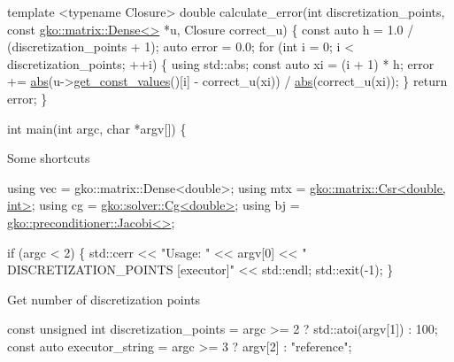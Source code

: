 \begin{DoxyCode}
\textcolor{keyword}{template} <\textcolor{keyword}{typename} Closure>
\textcolor{keywordtype}{double} calculate\_error(\textcolor{keywordtype}{int} discretization\_points, \textcolor{keyword}{const} \hyperlink{classgko_1_1matrix_1_1Dense}{gko::matrix::Dense<>} *u,
                       Closure correct\_u)
\{
    \textcolor{keyword}{const} \textcolor{keyword}{auto} h = 1.0 / (discretization\_points + 1);
    \textcolor{keyword}{auto} error = 0.0;
    \textcolor{keywordflow}{for} (\textcolor{keywordtype}{int} i = 0; i < discretization\_points; ++i) \{
        \textcolor{keyword}{using} std::abs;
        \textcolor{keyword}{const} \textcolor{keyword}{auto} xi = (i + 1) * h;
        error +=
            \hyperlink{namespacegko_a57797fc0a00fd4b7ff34ca4bfc84bc51}{abs}(u->\hyperlink{classgko_1_1matrix_1_1Dense_ab83c739c1b11abaecc3bfd89506f6c9c}{get\_const\_values}()[i] - correct\_u(xi)) / 
      \hyperlink{namespacegko_a57797fc0a00fd4b7ff34ca4bfc84bc51}{abs}(correct\_u(xi));
    \}
    \textcolor{keywordflow}{return} error;
\}


\textcolor{keywordtype}{int} main(\textcolor{keywordtype}{int} argc, \textcolor{keywordtype}{char} *argv[])
\{
\end{DoxyCode}


Some shortcuts


\begin{DoxyCode}
\textcolor{keyword}{using} vec = gko::matrix::Dense<double>;
\textcolor{keyword}{using} mtx = \hyperlink{classgko_1_1matrix_1_1Csr}{gko::matrix::Csr<double, int>};
\textcolor{keyword}{using} cg = \hyperlink{classgko_1_1solver_1_1Cg}{gko::solver::Cg<double>};
\textcolor{keyword}{using} bj = \hyperlink{classgko_1_1preconditioner_1_1Jacobi}{gko::preconditioner::Jacobi<>};

\textcolor{keywordflow}{if} (argc < 2) \{
    std::cerr << \textcolor{stringliteral}{"Usage: "} << argv[0] << \textcolor{stringliteral}{" DISCRETIZATION\_POINTS [executor]"}
              << std::endl;
    std::exit(-1);
\}
\end{DoxyCode}


Get number of discretization points


\begin{DoxyCode}
\textcolor{keyword}{const} \textcolor{keywordtype}{unsigned} \textcolor{keywordtype}{int} discretization\_points =
    argc >= 2 ? std::atoi(argv[1]) : 100;
\textcolor{keyword}{const} \textcolor{keyword}{auto} executor\_string = argc >= 3 ? argv[2] : \textcolor{stringliteral}{"reference"};
\end{DoxyCode}



